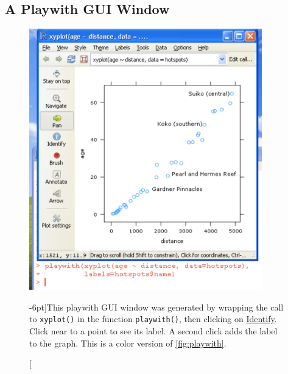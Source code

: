 \newpage

\subsection*{A Playwith GUI Window}

\enlargethispage{30pt}

\begin{figure}[h]
\centerline{\includegraphics[width=0.9\textwidth]{colorArt/playwith}}%
\caption[][-6pt]{This playwith GUI window was generated by wrapping the call
  to \texttt{xyplot()} in the function \texttt{playwith()}, then
  clicking on \underline{Identify}. Click near to a point to see its
  label. A second click adds the label to the graph.  This is a color version
of \ref{fig:playwith}.\label{col:playwith}}
\end{figure}


